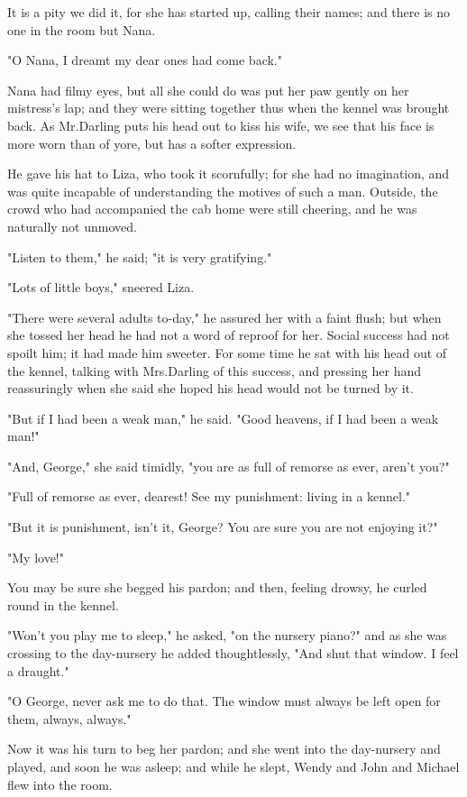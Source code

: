 It is a pity we did it, for she has started up, calling their names;
and there is no one in the room but Nana.

"O Nana, I dreamt my dear ones had come back."

Nana had filmy eyes, but all she could do was put her paw gently on her mistress's lap;
and they were sitting together thus when the kennel was brought back.
As Mr.\@ Darling puts his head out to kiss his wife, we see that his face is more worn than of yore, but has a softer expression.

He gave his hat to Liza, who took it scornfully;
for she had no imagination, and was quite incapable of understanding the motives of such a man.
Outside, the crowd who had accompanied the cab home were still cheering, and he was naturally not unmoved.

"Listen to them," he said;
"it is very gratifying."

"Lots of little boys," sneered Liza.

"There were several adults to-day," he assured her with a faint flush;
but when she tossed her head he had not a word of reproof for her.
Social success had not spoilt him;
it had made him sweeter.
For some time he sat with his head out of the kennel, talking with Mrs.\@ Darling of this success, and pressing her hand reassuringly when she said she hoped his head would not be turned by it.

"But if I had been a weak man," he said.
"Good heavens, if I had been a weak man!"

"And, George," she said timidly, "you are as full of remorse as ever, aren't you?"

"Full of remorse as ever, dearest!
See my punishment:
living in a kennel."

"But it is punishment, isn't it, George?
You are sure you are not enjoying it?"

"My love!"

You may be sure she begged his pardon;
and then, feeling drowsy, he curled round in the kennel.

"Won't you play me to sleep," he asked, "on the nursery piano?\@" and as she was crossing to the day-nursery he added thoughtlessly, "And shut that window.
I feel a draught."

"O George, never ask me to do that.
The window must always be left open for them, always, always."

Now it was his turn to beg her pardon;
and she went into the day-nursery and played, and soon he was asleep;
and while he slept, Wendy and John and Michael flew into the room.

